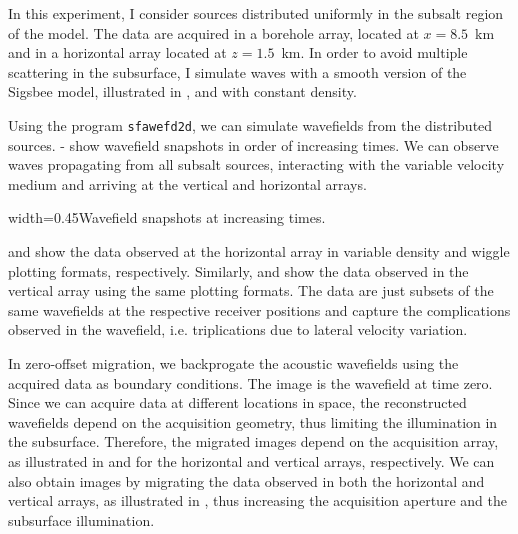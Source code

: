 In this experiment, I consider sources distributed uniformly in the
subsalt region of the model. The data are acquired in a borehole
array, located at $x=8.5$~km and in a horizontal array located at
$z=1.5$~km. In order to avoid multiple scattering in the subsurface, I
simulate waves with a smooth version of the Sigsbee model, illustrated
in , and with constant density.


Using the \mg program \texttt{sfawefd2d}, we can simulate wavefields
from the distributed sources. - show
wavefield snapshots in order of increasing times. We can observe waves
propagating from all subsalt sources, interacting with the variable
velocity medium and arriving at the vertical and horizontal arrays.

{width=0.45\textwidth}{Wavefield snapshots at increasing times.}

 and  show the data observed at the horizontal
array in variable density and wiggle plotting formats,
respectively. Similarly,  and  show the data
observed in the vertical array using the same plotting formats. The
data are just subsets of the same wavefields at the respective
receiver positions and capture the complications observed in the
wavefield, i.e. triplications due to lateral velocity variation.



In zero-offset migration, we backprogate the acoustic wavefields using
the acquired data as boundary conditions. The image is the wavefield
at time zero. Since we can acquire data at different locations in
space, the reconstructed wavefields depend on the acquisition
geometry, thus limiting the illumination in the subsurface. Therefore,
the migrated images depend on the acquisition array, as illustrated in
 and  for the horizontal and vertical arrays,
respectively.  We can also obtain images by migrating the data
observed in both the horizontal and vertical arrays, as illustrated in
, thus increasing the acquisition aperture and the
subsurface illumination.

